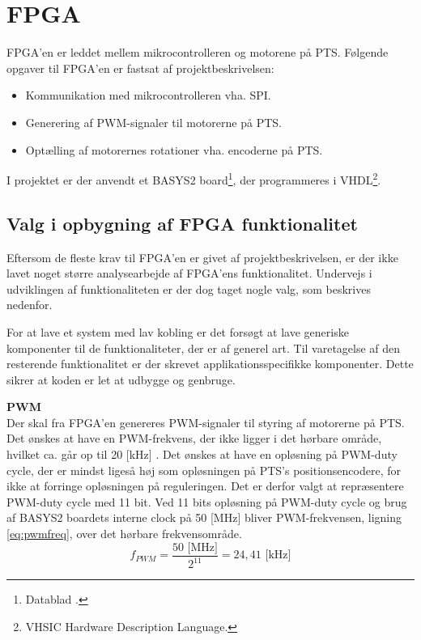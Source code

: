 \section{FPGA}
\label{sec:FPGA}
FPGA'en er leddet mellem mikrocontrolleren og motorene på PTS.
Følgende opgaver til FPGA'en er fastsat af projektbeskrivelsen:
\begin{itemize}
\itemsep1pt
	\item Kommunikation med mikrocontrolleren vha. SPI.
	\item Generering af PWM-signaler til motorerne på PTS.
	\item Optælling af motorernes rotationer vha. encoderne på PTS.
\end{itemize}
I projektet er der anvendt et BASYS2 board\footnote{Datablad \citep{basys2}.}, der programmeres i VHDL\footnote{VHSIC Hardware Description Language.}.

\subsection{Valg i opbygning af FPGA funktionalitet}
Eftersom de fleste krav til FPGA'en er givet af projektbeskrivelsen, er der ikke 
lavet noget større analysearbejde af FPGA'ens funktionalitet. Undervejs i 
udviklingen af funktionaliteten er der dog taget nogle valg, som beskrives nedenfor.

For at lave et system med lav kobling er det forsøgt at lave 
generiske komponenter til de funktionaliteter, der er af generel art. 
Til varetagelse af den resterende funktionalitet er der skrevet applikationsspecifikke 
komponenter.
Dette sikrer at koden er let at udbygge og genbruge.

\textbf{PWM}\\
Der skal fra FPGA'en genereres PWM-signaler til styring af motorerne på PTS.
Det ønskes at have en PWM-frekvens, der ikke ligger i det hørbare område, hvilket ca. går op til 20 [kHz] \citep{Hearingrange}. 
Det ønskes at have en opløsning på PWM-duty cycle, der er mindst ligeså høj som 
opløsningen på PTS's positionsencodere, for ikke at forringe opløsningen på reguleringen. 
Det er derfor valgt at repræsentere PWM-duty cycle med 11 bit. 
Ved 11 bits opløsning på PWM-duty cycle og brug af BASYS2 boardets interne clock på 50 [MHz] bliver PWM-frekvensen,
ligning \ref{eq:pwmfreq}, over det hørbare frekvensområde.
\begin{equation}
  f_{PWM}=\frac{50 \text{ [MHz]}}{2^{11}} = 24,41 \text{ [kHz]}
	\label{eq:pwmfreq}
\end{equation}

